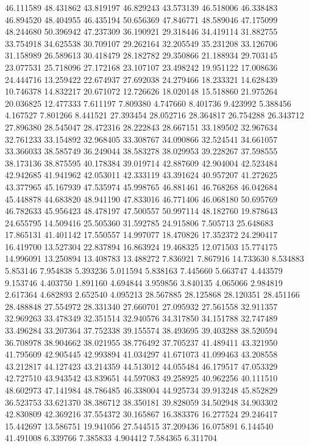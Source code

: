 46.111589
48.431862
43.819197
46.829243
43.573139
46.518006
46.338483
46.894520
48.404955
46.435194
50.656369
47.846771
48.589046
47.175099
48.244680
50.396942
47.237309
36.190921
29.318446
34.419114
31.882755
33.754918
34.625538
30.709107
29.262164
32.205549
35.231208
33.126706
31.158989
26.589613
30.418479
28.182782
29.350866
21.188934
29.703145
23.077531
25.718096
27.172168
23.107107
23.498242
19.951122
17.008636
24.444716
13.259422
22.674937
27.692038
24.279466
18.233321
14.628439
10.746378
14.832217
20.671072
12.726626
18.020148
15.518860
21.975264
20.036825
12.477333
7.611197
7.809380
4.747660
8.401736
9.423992
5.388456
4.167527
7.801266
8.441521
27.393454
28.052716
28.364817
26.754288
26.343712
27.896380
28.545047
28.472316
28.222843
28.667151
33.189502
32.967634
32.761233
33.154892
32.968405
33.308767
34.090866
32.524541
34.661057
33.366033
38.585749
36.249044
38.583278
38.029953
39.228267
37.598555
38.173136
38.875595
40.178384
39.019714
42.887609
42.904004
42.523484
42.942685
41.941962
42.053011
42.333119
43.391624
40.957207
41.272625
43.377965
45.167939
47.535974
45.998765
46.881461
46.768268
46.042684
45.448878
44.683820
48.941190
47.833016
46.771406
46.068180
50.695769
46.782633
45.956423
48.478197
47.500557
50.997114
48.182760
19.878643
24.655795
14.509416
25.505360
31.592785
24.915806
7.505713
25.648683
17.865131
41.401142
17.550557
14.997077
18.470826
17.352372
24.290417
16.419700
13.527304
22.837894
16.863924
19.468325
12.071503
15.774175
14.996091
13.250894
13.408783
13.488272
7.836921
7.867916
14.733630
8.534883
5.853146
7.954838
5.393236
5.011594
5.838163
7.445660
5.663747
4.443579
9.153746
4.403750
1.891160
4.694844
3.959856
3.840135
4.065066
2.984819
2.617364
4.682893
2.652540
4.095213
28.567885
28.125868
28.120351
28.451166
28.488848
27.554972
28.331340
27.660701
27.095932
27.561558
32.911357
32.969263
33.478349
32.351514
32.940576
34.317850
34.151788
32.747489
33.496284
33.207364
37.752338
39.155574
38.493695
39.403288
38.520594
36.708978
38.904662
38.021955
38.776492
37.705237
41.489411
43.321950
41.795609
42.905445
42.993894
41.034297
41.671073
41.099463
43.208558
43.212817
44.127423
43.214359
44.513012
44.055484
46.179517
47.053329
42.727510
43.943542
43.839651
44.597083
49.258925
40.962256
40.111510
48.602973
47.141984
48.786485
46.338004
44.925734
39.913248
45.852829
36.523753
33.621370
38.386712
38.350181
39.828059
34.502948
34.903302
42.830809
42.369216
37.554372
30.165867
16.383376
16.277524
29.246417
15.442697
13.586751
19.941056
27.544515
37.209436
16.075891
6.144540
41.491008
6.339766
7.385833
4.904412
7.584365
6.311704
